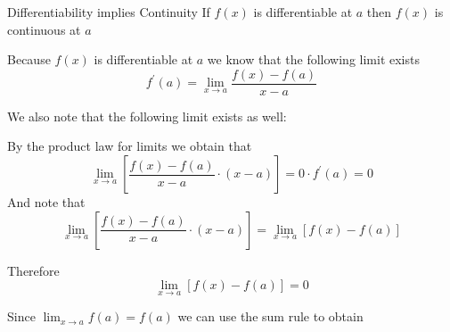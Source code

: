\begin{proposition}{Differentiability implies Continuity}
  If $f\left(x\right)$ is differentiable at $a$ then $f\left(x\right)$ is continuous at $a$ 
     \item Because $f\left(x\right)$ is differentiable at $a$  we know that the following limit exists 
       \[
       f ^{ \prime }\left(a\right) = \lim_{x \to a } \frac{ f\left(x\right)  -  f\left(a\right)}{ x  -  a}
       \]
      \item We also note that the following limit exists as well:
      \item By the product law for limits we obtain that 
        \[
        \lim_{x \to a} \left[ \frac{f\left(x\right)  -  f\left(a\right)}{x  -  a}  \cdot  \left( x  -  a \right)  \right] = 0  \cdot  f ^{\prime}\left(a\right) = 0
        \]
        And note that  
        \[
          \lim_{x \to a} \left[ \frac{f\left(x\right)  -  f\left(a\right)}{x  -  a}  \cdot  \left( x  -  a \right)  \right] = \lim_{x \to a} \left[f\left(x\right)  -  f\left(a\right)  \right]
        \]
        \item Therefore
          \[
          \lim_{x \to a} \left[f\left(x\right)  -  f\left(a\right)  \right] = 0
          \]
        \item Since $\lim_{x \to a} f\left(a\right) = f\left(a\right)$ we can use the sum rule to obtain 
\end{proposition}




